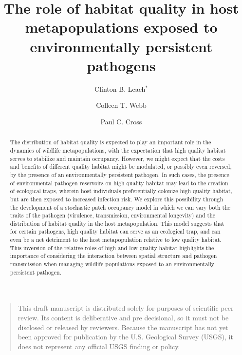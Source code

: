 \documentclass{article}
\begin{document}
\title{The role of habitat quality in host metapopulations exposed to environmentally persistent pathogens}


\author[1]{Clinton B. Leach$^*$}
\author[1]{Colleen T. Webb}
\author[2]{Paul C. Cross}


\maketitle


\begin{quote}
This draft manuscript is distributed solely for purposes of scientific peer review.  Its content is deliberative and pre decisional, so it must not be disclosed or released by reviewers.  Because the manuscript has not yet been approved for publication by the U.S. Geological Survey (USGS), it does not represent any official USGS finding or policy.
\end{quote}


\begin{abstract} 
The distribution of habitat quality is expected to play an important role in the dynamics of wildlife metapopulations, with the expectation that high quality habitat serves to stabilize and maintain occupancy.  However, we might expect that the costs and benefits of different quality habitat might be modulated, or possibly even reversed, by the presence of an environmentally persistent pathogen.  In such cases, the presence of environmental pathogen reservoirs on high quality habitat may lead to the creation of ecological traps, wherein host individuals preferentially colonize high quality habitat, but are then exposed to increased infection risk.  We explore this possibility through the development of a stochastic patch occupancy model in which we can vary both the traits of the pathogen (virulence, transmission, environmental longevity) and the distribution of habitat quality in the host metapopulation.  This model suggests that for certain pathogens, high quality habitat can serve as an ecological trap, and can even be a net detriment to the host metapopulation relative to low quality habitat.  This inversion of the relative roles of high and low quality habitat highlights the importance of considering the interaction between spatial structure and pathogen transmission when managing wildlife populations exposed to an environmentally persistent pathogen.
\end{abstract}
\end{document}
